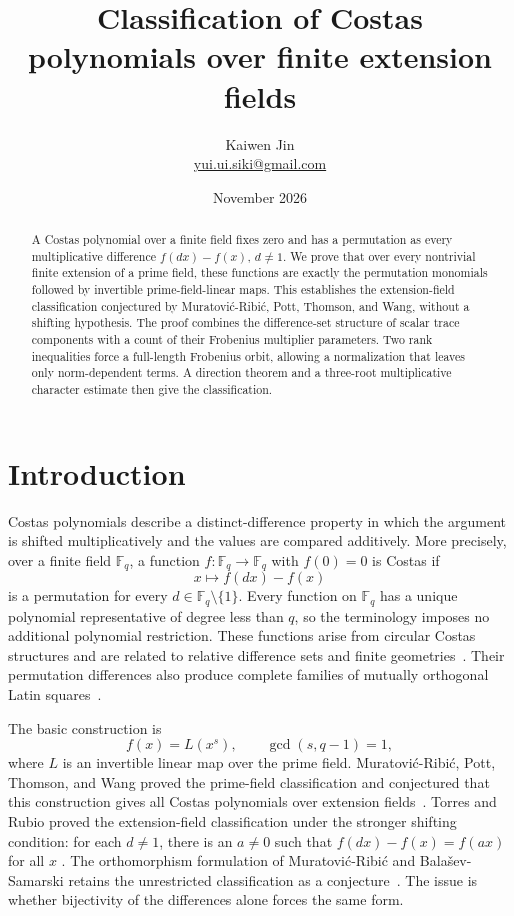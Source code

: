 \documentclass[11pt]{article}
\title{Classification of Costas polynomials over finite extension fields}
\author{Kaiwen Jin\\ \small\href{mailto:yui.ui.siki@gmail.com}{yui.ui.siki@gmail.com}}
\date{November 2026}
\theoremstyle{definition}
\theoremstyle{remark}
\newcommand{\Fq}{\mathbb F_q}
\numberwithin{equation}{section}
\begin{document}
\maketitle
\begin{abstract}
A Costas polynomial over a finite field fixes zero and has a permutation
as every multiplicative difference \(f(dx)-f(x)\), \(d\ne1\).
We prove that over every nontrivial finite extension of a prime field,
these functions are exactly the permutation monomials followed by
invertible prime-field-linear maps. This establishes the extension-field
classification conjectured by Muratovi\'c-Ribi\'c, Pott, Thomson, and Wang,
without a shifting hypothesis. The proof combines the difference-set
structure of scalar trace components with a count of their Frobenius
multiplier parameters. Two rank inequalities force a full-length
Frobenius orbit, allowing a normalization that leaves only norm-dependent
terms. A direction theorem and a three-root multiplicative character
estimate then give the classification.
\end{abstract}

\section{Introduction}
\label{sec:introduction}

Costas polynomials describe a distinct-difference property in which
the argument is shifted multiplicatively and the values are compared
additively. More precisely, over a finite field \(\Fq\), a function
\(f:\Fq\to\Fq\) with \(f(0)=0\) is Costas if
\[
 x\longmapsto f(dx)-f(x)
\]
is a permutation for every \(d\in\Fq\setminus\{1\}\).
Every function on \(\Fq\) has a unique polynomial representative of
degree less than \(q\), so the terminology imposes no additional
polynomial restriction. These functions arise from circular Costas
structures and are related to relative difference sets and finite
geometries~\cite{Costas2015,RubioTorres}. Their permutation differences
also produce complete families of mutually orthogonal Latin
squares~\cite{Costas2026}.

The basic construction is
\[
 f(x)=L(x^s),\qquad \gcd(s,q-1)=1,
\]
where \(L\) is an invertible linear map over the prime field.
Muratovi\'c-Ribi\'c, Pott, Thomson, and Wang proved the prime-field
classification and conjectured that this construction gives all
Costas polynomials over extension fields~\cite[author version,
Corollary~4.2 and Conjecture~4.4]{Costas2015}.
Torres and Rubio proved the extension-field classification under the
stronger shifting condition: for each \(d\ne1\), there is an \(a\ne0\)
such that \(f(dx)-f(x)=f(ax)\) for all \(x\)
\cite[Definition~35 and Theorem~38 of arXiv:2210.16661v1]{RubioTorres}.
The orthomorphism formulation of
Muratovi\'c-Ribi\'c and Bala\v sev-Samarski retains the unrestricted
classification as a conjecture~\cite[Sections~1--2]{Costas2026}.
The issue is whether bijectivity of the differences alone forces the
same form.
\end{document}
